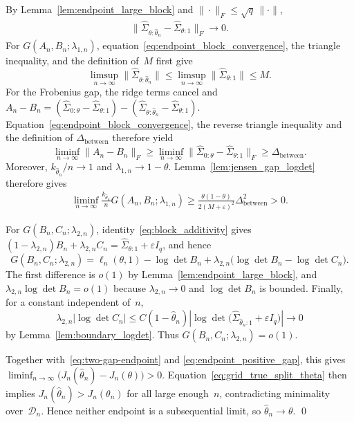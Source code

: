 \documentclass[10pt, letterpaper]{amsart}
\begin{document}
 By Lemma~\ref{lem:endpoint_large_block} and $\|\cdot\|_F\leq\sqrt q\,\|\cdot\|$,
\begin{align}\label{eq:endpoint_block_convergence}
\big\|\widehat\Sigma_{\theta:\widehat\theta_n}
-\widehat\Sigma_{\theta:1}\big\|_F\longrightarrow0.
\end{align}
For $G(A_n,B_n;\lambda_{1,n})$, equation~\eqref{eq:endpoint_block_convergence}, the triangle
inequality, and the definition of~$M$ first give
\[
\limsup_{n\to\infty}\|\widehat\Sigma_{\theta:\widehat\theta_n}\|
\leq
\limsup_{n\to\infty}\|\widehat\Sigma_{\theta:1}\|
\leq M.
\]
For the Frobenius gap, the ridge terms cancel and
$A_n-B_n=(\widehat\Sigma_{0:\theta}-\widehat\Sigma_{\theta:1})-(\widehat\Sigma_{\theta:\widehat\theta_n}-\widehat\Sigma_{\theta:1})$.
 Equation~\eqref{eq:endpoint_block_convergence}, the reverse triangle inequality and the definition of
$\Delta_{\mathrm{between}}$ therefore yield
\[
\liminf_{n\to\infty}\|A_n-B_n\|_F
\geq
\liminf_{n\to\infty}
\|\widehat\Sigma_{0:\theta}-\widehat\Sigma_{\theta:1}\|_F
\geq\Delta_{\mathrm{between}}.
\]
Moreover,
$k_{\widehat\theta_n}/n\to1$ and
$\lambda_{1,n}\to1-\theta$. Lemma~\ref{lem:jensen_gap_logdet} therefore gives
\begin{align}\label{eq:endpoint_positive_gap}
\liminf_{n\to\infty}
\frac{k_{\widehat\theta_n}}{n}
G(A_n,B_n;\lambda_{1,n})
\geq
\frac{\theta(1-\theta)}{2(M+\varepsilon)^2}
\Delta_{\mathrm{between}}^2>0.
\end{align}

 For $G(B_n,C_n;\lambda_{2,n})$, identity~\eqref{eq:block_additivity} gives
$(1-\lambda_{2,n})B_n+\lambda_{2,n}C_n=\widehat\Sigma_{\theta:1}+\varepsilon I_q$,
and hence
\[
G(B_n,C_n;\lambda_{2,n})
=\ell_n(\theta,1)-\log\det B_n
+\lambda_{2,n}\bigl(\log\det B_n-\log\det C_n\bigr).
\]
The first difference is $o(1)$ by Lemma~\ref{lem:endpoint_large_block}, and
$\lambda_{2,n}\log\det B_n=o(1)$ because $\lambda_{2,n}\to0$ and
$\log\det B_n$ is bounded. Finally, for a constant independent of~$n$,
\[
\lambda_{2,n}|\log\det C_n|
\leq C(1-\widehat\theta_n)
\left|\log\det\bigl(
\widehat\Sigma_{\widehat\theta_n:1}+\varepsilon I_q
\bigr)\right|
\longrightarrow0
\]
by Lemma~\ref{lem:boundary_logdet}. Thus
$G(B_n,C_n;\lambda_{2,n})=o(1)$.

Together with~\eqref{eq:two-gap-endpoint} and
\eqref{eq:endpoint_positive_gap}, this gives
$\liminf_{n\to\infty}\bigl(J_n(\widehat\theta_n)-J_n(\theta)\bigr)>0$.
Equation~\eqref{eq:grid_true_split_theta} then implies
$J_n(\widehat\theta_n)>J_n(\theta_n)$ for all large enough~$n$, contradicting
minimality over~$\mathcal D_n$. Hence neither endpoint is a subsequential
limit, so $\widehat\theta_n\to\theta$. \qed
\end{document}
